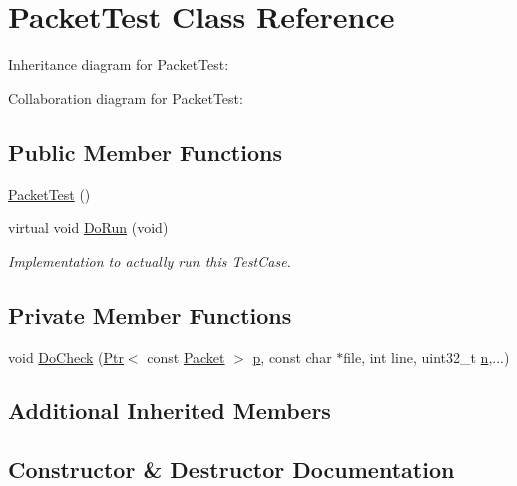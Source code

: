 \hypertarget{classPacketTest}{}\section{Packet\+Test Class Reference}
\label{classPacketTest}


Inheritance diagram for Packet\+Test\+:


Collaboration diagram for Packet\+Test\+:
\subsection*{Public Member Functions}
\begin{DoxyCompactItemize}
\item 
\hyperlink{classPacketTest_a7e1c13354e65690b6e464a234bb3a9ee}{Packet\+Test} ()
\item 
virtual void \hyperlink{classPacketTest_a2f4d69aa1b21616ea14efd54fee55da2}{Do\+Run} (void)
\begin{DoxyCompactList}\small\item\em Implementation to actually run this Test\+Case. \end{DoxyCompactList}\end{DoxyCompactItemize}
\subsection*{Private Member Functions}
\begin{DoxyCompactItemize}
\item 
void \hyperlink{classPacketTest_a8bfedb5c3b60f014e305a87701e73797}{Do\+Check} (\hyperlink{classns3_1_1Ptr}{Ptr}$<$ const \hyperlink{classns3_1_1Packet}{Packet} $>$ \hyperlink{lte__link__budget__x2__handover__measures_8m_ac9de518908a968428863f829398a4e62}{p}, const char $\ast$file, int line, uint32\+\_\+t \hyperlink{lte__link__budget__x2__handover__measures_8m_abdb05bc5a064cf642a06c83b3392f148}{n},...)
\end{DoxyCompactItemize}
\subsection*{Additional Inherited Members}


\subsection{Constructor \& Destructor Documentation}
